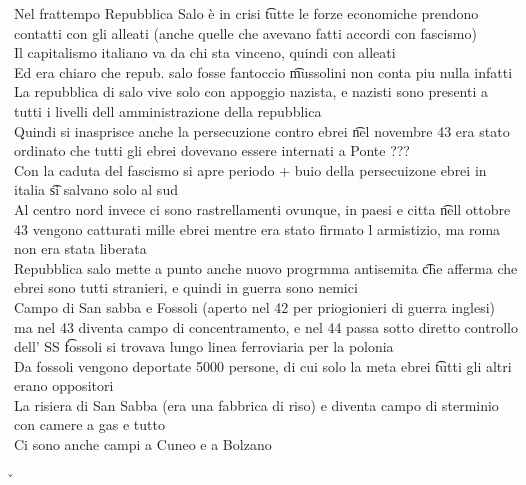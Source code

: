 \documentclass[12pt]{article}
\begin{document}
Nel frattempo Repubblica Salo è in crisi \t tutte le forze economiche prendono contatti con gli alleati (anche quelle che avevano fatti accordi con fascismo) \\
Il capitalismo italiano va da chi sta vinceno, quindi con alleati \\
Ed era chiaro che repub. salo fosse fantoccio \t mussolini non conta piu nulla infatti \\
La repubblica di salo vive solo con appoggio nazista, e nazisti sono presenti a tutti i livelli dell amministrazione della repubblica \\
Quindi si inasprisce anche la persecuzione contro ebrei \t nel novembre 43 era stato ordinato che tutti gli ebrei dovevano essere internati a Ponte ??? \\
Con la caduta del fascismo si apre periodo + buio della persecuizone ebrei in italia \t si salvano solo al sud \\
Al centro nord invece ci sono rastrellamenti ovunque, in paesi e citta \t nell ottobre 43 vengono catturati mille ebrei mentre era stato firmato l armistizio, ma roma non era stata liberata \\
Repubblica salo mette a punto anche nuovo progrmma antisemita \t che afferma che ebrei sono tutti stranieri, e quindi in guerra sono nemici \\
Campo di San sabba  e Fossoli (aperto nel 42 per priogionieri di guerra inglesi) ma nel 43 diventa campo di concentramento, e nel 44 passa sotto diretto controllo dell' SS \t fossoli si trovava lungo linea ferroviaria per la polonia \\
Da fossoli vengono deportate 5000 persone, di cui solo la meta ebrei \t tutti gli altri erano oppositori \\
La risiera di San Sabba (era una fabbrica di riso) e diventa campo di sterminio con camere a gas e tutto \\
Ci sono anche campi a Cuneo e a Bolzano

\v
\end{document}
